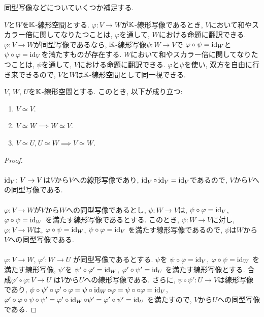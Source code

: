 同型写像などについていくつか補足する.

\begin{remark}
  $V$と$W$を$\mathbb{K}$-線形空間とする.
  $\varphi\colon V\to W$が$\mathbb{K}$-線形写像であるとき,
  $V$において和やスカラー倍に関してなりたつことは,
  $\varphi$を通して, $W$における命題に翻訳できる.
  $\varphi\colon V\to W$が同型写像であるなら,
  $\mathbb{K}$-線形写像$\psi\colon W\to V$で
  $\varphi\circ \psi=\operatorname{id}_W$と
  $\psi\circ \varphi=\operatorname{id}_V$を満たすものが存在する.
  $W$において和やスカラー倍に関してなりたつことは,
  $\psi$を通して, $V$における命題に翻訳できる.
  $\varphi$と$\psi$を使い, 双方を自由に行き来できるので,
  $V$と$W$は$\mathbb{K}$-線形空間として同一視できる.
\end{remark}


\begin{prop}
  $V$, $W$, $U$を$\mathbb{K}$-線形空間とする.
  このとき, 以下が成り立つ:
  \begin{enumerate}
  \item
\label{prop:isoisequiv:1}
$V\simeq V$.
  \item
  \label{prop:isoisequiv:2}
  $V\simeq W \implies W\simeq V$.
  \item
\label{prop:isoisequiv:3}
$V\simeq U, U\simeq W \implies V\simeq W$.
  \end{enumerate}
\end{prop}
\begin{proof}
\paragraph{}
$\operatorname{id}_V\colon V\to V$は$V$から$V$への線形写像であり,
$\operatorname{id}_V\circ \operatorname{id}_V=\operatorname{id}_V$であるので,
$V$から$V$への同型写像である.

\paragraph{}
$\varphi\colon V\to W$が$V$から$W$への同型写像であるとし,
$\psi\colon W\to V$は,
$\psi\circ \varphi =\operatorname{id}_V$,
$\varphi\circ \psi =\operatorname{id}_W$
を満たす線形写像であるとする.
このとき,
$\psi\colon W\to V$に対し,
$\varphi\colon V\to W$は,
$\varphi\circ \psi =\operatorname{id}_W$,
$\psi\circ \varphi =\operatorname{id}_V$
を満たす線形写像であるので,
$\psi$は$W$から$V$への同型写像である.

\paragraph{}
$\varphi\colon V\to W$,
$\varphi'\colon W\to U$
が同型写像であるとする.
$\psi$を
$\psi\circ \varphi=\operatorname{id}_V$,
$\varphi\circ\psi =\operatorname{id}_W$
を満たす線形写像,
$\psi'$を
$\psi'\circ \varphi'=\operatorname{id}_W$,
$\varphi'\circ\psi' =\operatorname{id}_U$
を満たす線形写像とする.
合成$\varphi'\circ\varphi\colon V\to U$
は$V$から$U$への線形写像である.
さらに,
$\psi\circ\psi'\colon U\to V$は線形写像であり,
$\psi\circ\psi'\circ\varphi'\circ\varphi=\psi\circ \operatorname{id}_W \circ\varphi=\psi\circ\circ\varphi=\operatorname{id}_V$,
$\varphi'\circ\varphi\circ\psi\circ\psi'=\varphi'\circ\operatorname{id}_W\circ\psi'=\varphi'\circ\psi'=\operatorname{id}_U$
を満たすので,
$V$から$U$への同型写像である.
\end{proof}

